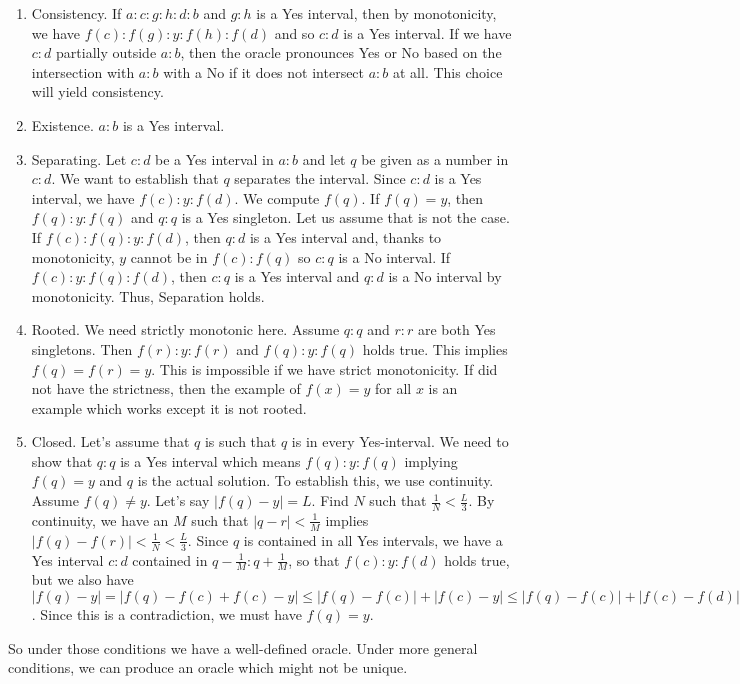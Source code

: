 \documentclass[12pt]{article}
\theoremstyle{remark}
\begin{document}
\begin{enumerate}
    \item Consistency. If $a:c:g:h:d:b$ and $g:h$ is a Yes interval, then by monotonicity, we have $f(c):f(g):y:f(h):f(d)$ and so $c:d$ is a Yes interval. If we have $c:d$ partially outside $a:b$, then the oracle pronounces Yes or No based on the intersection with $a:b$ with a No if it does not intersect $a:b$ at all. This choice will yield consistency. 
    \item Existence. $a:b$ is a Yes interval.
    \item Separating. Let $c:d$ be a Yes interval in $a:b$ and let $q$ be given as a number in $c:d$. We want to establish that $q$ separates the interval. Since $c:d$ is a Yes interval, we have $f(c):y:f(d)$. We compute $f(q)$. If $f(q) = y$, then $f(q):y:f(q)$ and $q:q$ is a Yes singleton. Let us assume that is not the case. If $f(c):f(q):y:f(d)$, then $q:d$ is a Yes interval and, thanks to monotonicity, $y$ cannot be in $f(c):f(q)$ so $c:q$ is a No interval. If $f(c):y:f(q):f(d)$, then $c:q$ is a Yes interval and $q:d$ is a No interval by monotonicity. Thus, Separation holds. 
    \item Rooted. We need strictly monotonic here. Assume $q:q$ and $r:r$ are both Yes singletons. Then $f(r):y:f(r)$ and $f(q):y:f(q)$ holds true. This implies $f(q)=f(r)=y$. This is impossible if we have strict monotonicity. If did not have the strictness, then the example of $f(x)=y$ for all $x$ is an example which works except it is not rooted.  
    \item Closed. Let's assume that $q$ is such that $q$ is in every Yes-interval. We need to show that $q:q$ is a Yes interval which means $f(q):y:f(q)$ implying $f(q) =y$ and $q$ is the actual solution. To establish this, we use continuity. Assume $f(q) \neq y$. Let's say $|f(q)  - y| = L$. Find $N$ such that $\frac{1}{N} < \frac{L}{3}$. By continuity, we have an $M$ such that $|q-r|<\frac{1}{M}$ implies $|f(q)-f(r)| < \frac{1}{N} < \frac{L}{3}$. Since $q$ is contained in all Yes intervals, we have a Yes interval $c:d$ contained in $q-\frac{1}{M}:q+\frac{1}{M}$, so that $f(c):y:f(d)$ holds true, but we also have $|f(q)-y| = |f(q) - f(c) + f(c) - y| \leq |f(q)-f(c)| + |f(c)-y| \leq |f(q)-f(c)| + |f(c) - f(d)| \leq |f(q) - f(c) | + |f(c) - f(q)| + |f(q) - f(d)| < L$. Since this is a contradiction, we must have $f(q) = y$.
\end{enumerate}

So under those conditions we have a well-defined oracle. Under more general conditions, we can produce an oracle which might not be unique.  
\end{document}
